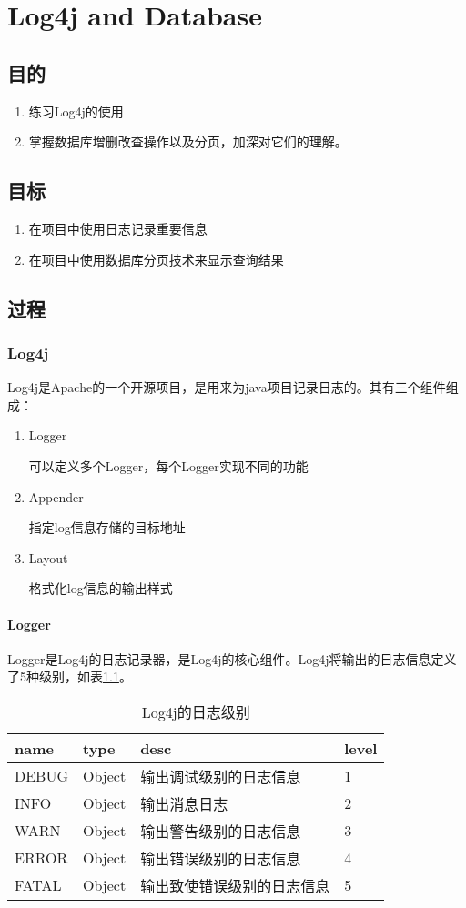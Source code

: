 \chapter{Log4j and Database}

\section{目的}
\begin{enumerate}
\item
练习Log4j的使用
\item
掌握数据库增删改查操作以及分页，加深对它们的理解。
\end{enumerate}
\section{目标}
\begin{enumerate}
\item
在项目中使用日志记录重要信息
\item
在项目中使用数据库分页技术来显示查询结果
\end{enumerate}

\section{过程}
\subsection{Log4j}
Log4j是Apache的一个开源项目，是用来为java项目记录日志的。其有三个组件组成：
\begin{enumerate}
\item
Logger

可以定义多个Logger，每个Logger实现不同的功能
\item
Appender

指定log信息存储的目标地址
\item
Layout

格式化log信息的输出样式
\end{enumerate}
\subsubsection{Logger}
Logger是Log4j的日志记录器，是Log4j的核心组件。Log4j将输出的日志信息定义了5种级别，如表\ref{loggerLevel}。
\begin{table}
\begin{tabular}{llll}
\toprule
\textbf{name}&\textbf{type}&\textbf{desc}&\textbf{level}\\
\midrule
DEBUG&Object&输出调试级别的日志信息&1\\
INFO&Object&输出消息日志&2\\
WARN&Object&输出警告级别的日志信息&3\\
ERROR&Object&输出错误级别的日志信息&4\\
FATAL&Object&输出致使错误级别的日志信息&5\\
\bottomrule
\end{tabular}
\caption{Log4j的日志级别}
\label{loggerLevel}
\end{table}
